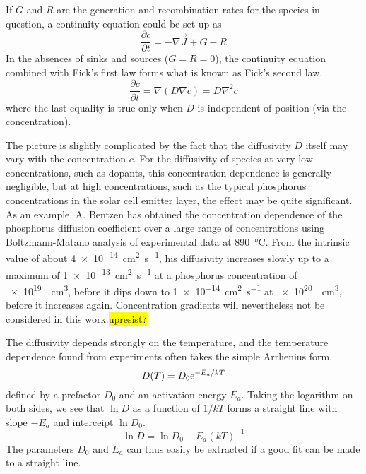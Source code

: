 \documentclass[11pt,bibliography=totoc,index=totoc]{scrbook}   %
\newcommand{\comment}[1]{\hl{#1}}
\begin{document}
If $G$ and $R$ are the generation and recombination rates for the species in question, a continuity equation could be set up as
\begin{equation}
    \frac{\partial c}{\partial t} = -\nabla \vec{J} + G - R
  \label{eq:continuity}
\end{equation}
In the absences of sinks and sources ($G=R=0$), the continuity equation combined with Fick's first law forms what is known as Fick's second law,
\begin{equation}
    \frac{\partial c}{\partial t} = \nabla (D \nabla c) = D \nabla^2 c
  \label{eq:ficks2nd}
\end{equation}
where the last equality is true only when $D$ is independent of position (via the concentration).

The picture is slightly complicated by the fact that the diffusivity $D$ itself may vary with the concentration $c$.
For the diffusivity of species at very low concentrations, such as dopants, this concentration dependence is generally negligible, but at high concentrations, such as the typical phosphorus concentrations in the solar cell emitter layer, the effect may be quite significant.
As an example, A. Bentzen has obtained the concentration dependence of the phosphorus diffusion coefficient over a large range of concentrations using Boltzmann-Matano analysis of experimental data at \SI{890}{\celsius}. 
From the intrinsic value of about \SI{4e-14}{\centi\metre\squared\per\second}, his diffusivity increases slowly up to a maximum of \SI{1e-13}{\centi\metre\squared\per\second} at a phosphorus concentration of \SI{e19}{\per\centi\metre\cubed}, before it dips down to \SI{1e-14}{\centi\metre\squared\per\second} at \SI{e20}{\per\centi\metre\cubed}, before it increases again.\cite{Bentzen:2006} Concentration gradients will nevertheless not be considered in this work.\comment{upresist?}

The diffusivity depends strongly on the temperature, and the temperature dependence found from experiments often takes the simple Arrhenius form,
\begin{equation}
  D(T) = D_0 \mathrm{e}^{-E_a/kT}
  \label{eq:arrhenius-dif}
\end{equation}
defined by a prefactor $D_0$ and an activation energy $E_a$. 
Taking the logarithm on both sides, we see that $\ln D$ as a function of $1/kT$ forms a straight line with slope $-E_a$ and interceipt $\ln D_0$. 
\begin{equation}
  \ln D = \ln D_0 - E_a (kT)^{-1}
\end{equation}
The parameters $D_0$ and $E_a$ can thus easily be extracted if a good fit can be made to a straight line.
\end{document}
